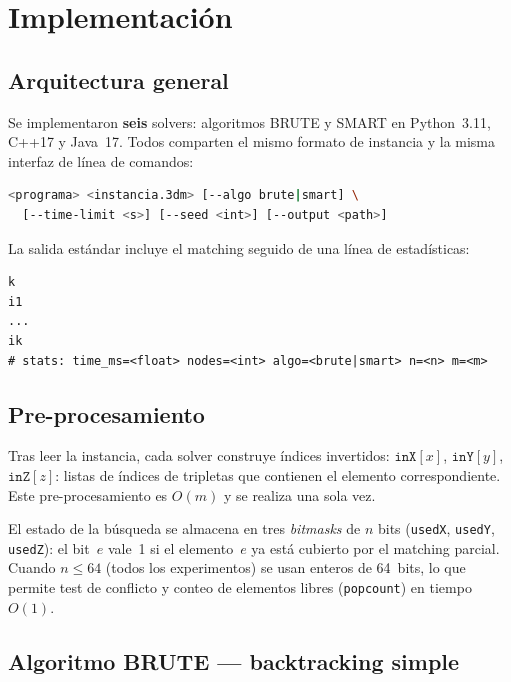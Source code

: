 \section{Implementación}
\label{sec:implementacion}

\subsection{Arquitectura general}
\label{sec:impl:arquitectura}

Se implementaron \textbf{seis} solvers: algoritmos BRUTE y SMART en
Python~3.11, C++17 y Java~17.
Todos comparten el mismo formato de instancia y la misma
interfaz de l\'inea de comandos:
\begin{lstlisting}[language=bash,basicstyle=\ttfamily\footnotesize]
<programa> <instancia.3dm> [--algo brute|smart] \
  [--time-limit <s>] [--seed <int>] [--output <path>]
\end{lstlisting}
La salida estándar incluye el matching seguido de una línea de estadísticas:
\begin{lstlisting}
k
i1
...
ik
# stats: time_ms=<float> nodes=<int> algo=<brute|smart> n=<n> m=<m>
\end{lstlisting}

\subsection{Pre-procesamiento}
\label{sec:impl:preproceso}

Tras leer la instancia, cada solver construye índices invertidos:
$\texttt{inX}[x]$, $\texttt{inY}[y]$, $\texttt{inZ}[z]$: listas de índices
de tripletas que contienen el elemento correspondiente.
Este pre-procesamiento es $O(m)$ y se realiza una sola vez.

El estado de la búsqueda se almacena en tres \emph{bitmasks} de $n$ bits
(\texttt{usedX}, \texttt{usedY}, \texttt{usedZ}): el bit~$e$ vale~1 si el
elemento~$e$ ya está cubierto por el matching parcial.
Cuando $n\le 64$ (todos los experimentos) se usan enteros de 64~bits, lo que
permite test de conflicto y conteo de elementos libres (\texttt{popcount}) en
tiempo $O(1)$.

\subsection{Algoritmo BRUTE --- backtracking simple}
\label{sec:impl:brute}


